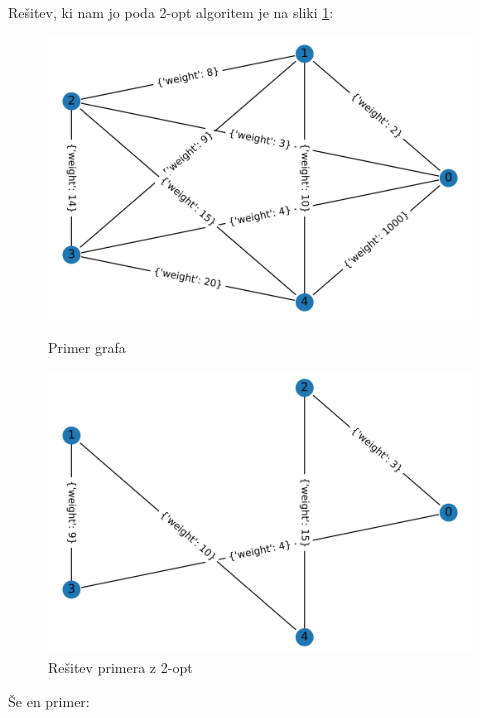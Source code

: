 \documentclass[12pt, a4paper]{article}
\begin{document}
Rešitev, ki nam jo poda 2-opt algoritem je na sliki \ref{resitev_2_opt}:

\begin{figure}[!h]
    
    \begin{minipage}{0.5\textwidth}
    \includegraphics[width=7 cm]{primeri/primer1.png}
    \caption{Primer grafa}
    \label{primeri/primer1.png}
  \end{minipage}
 \hspace{1cm}
  \begin{minipage}{0.5\textwidth}
    \includegraphics[width=7 cm]{primeri/primer1_2opt.png}
    \caption{Rešitev primera z 2-opt}
    \label{resitev_2_opt}
  \end{minipage}
    
\end{figure}

Še en primer:

%    
%    
\end{document}
